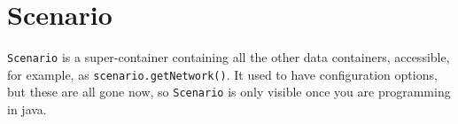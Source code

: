

\section{Scenario}
\label{sec:extending-scenario}

\lstinline{Scenario} is a super-container containing all the other data containers, accessible, for example, as \lstinline{scenario.getNetwork()}.  It used to have configuration options, but these are all gone now, so \lstinline{Scenario} is only visible once you are programming in \gls{java}. 

